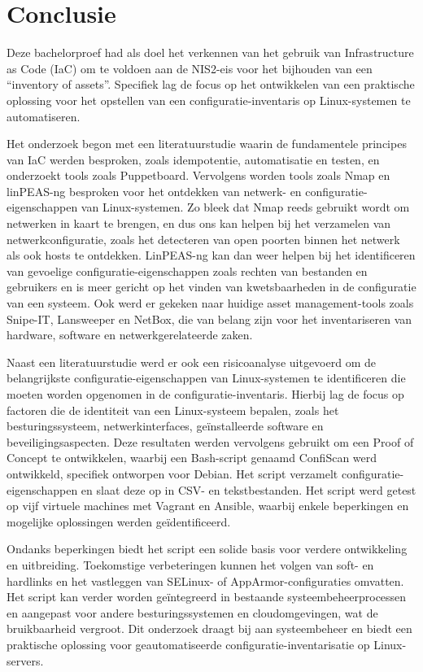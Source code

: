 
\chapter{Conclusie}%
\label{ch:conclusie}

Deze bachelorproef had als doel het verkennen van het gebruik van Infrastructure as Code (IaC) om te voldoen aan de NIS2-eis voor het bijhouden van een ``inventory of assets''.
Specifiek lag de focus op het ontwikkelen van een praktische oplossing voor het opstellen van een configuratie-inventaris op Linux-systemen te automatiseren.

Het onderzoek begon met een literatuurstudie waarin de fundamentele principes van IaC werden besproken, zoals idempotentie, automatisatie en testen, en onderzoekt tools zoals Puppetboard.
Vervolgens worden tools zoals Nmap en linPEAS-ng besproken voor het ontdekken van netwerk- en configuratie-eigenschappen van Linux-systemen.
Zo bleek dat Nmap reeds gebruikt wordt om netwerken in kaart te brengen, en dus ons kan helpen bij het verzamelen van netwerkconfiguratie, zoals het detecteren van open poorten binnen het netwerk als ook hosts te ontdekken.
LinPEAS-ng kan dan weer helpen bij het identificeren van gevoelige configuratie-eigenschappen zoals rechten van bestanden en gebruikers en is meer gericht op het vinden van kwetsbaarheden in de configuratie van een systeem.
Ook werd er gekeken naar huidige asset management-tools zoals Snipe-IT, Lansweeper en NetBox, die van belang zijn voor het inventariseren van hardware, software en netwerkgerelateerde zaken.

Naast een literatuurstudie werd er ook een risicoanalyse uitgevoerd om de belangrijkste configuratie-eigenschappen van Linux-systemen te identificeren die moeten worden opgenomen in de configuratie-inventaris.
Hierbij lag de focus op factoren die de identiteit van een Linux-systeem bepalen, zoals het besturingssysteem, netwerkinterfaces, ge\"installeerde software en beveiligingsaspecten.
Deze resultaten werden vervolgens gebruikt om een Proof of Concept te ontwikkelen, waarbij een Bash-script genaamd ConfiScan werd ontwikkeld, specifiek ontworpen voor Debian.
Het script verzamelt configuratie-eigenschappen en slaat deze op in CSV- en tekstbestanden.
Het script werd getest op vijf virtuele machines met Vagrant en Ansible, waarbij enkele beperkingen en mogelijke oplossingen werden ge\"identificeerd.

Ondanks beperkingen biedt het script een solide basis voor verdere ontwikkeling en uitbreiding.
Toekomstige verbeteringen kunnen het volgen van soft- en hardlinks en het vastleggen van SELinux- of AppArmor-configuraties omvatten.
Het script kan verder worden ge\"integreerd in bestaande systeembeheerprocessen en aangepast voor andere besturingssystemen en cloudomgevingen, wat de bruikbaarheid vergroot.
Dit onderzoek draagt bij aan systeembeheer en biedt een praktische oplossing voor geautomatiseerde configuratie-inventarisatie op Linux-servers.
